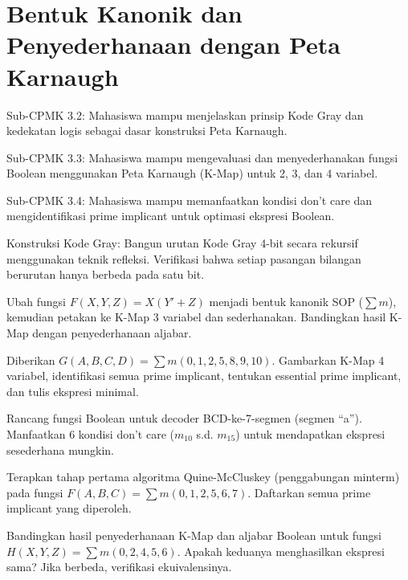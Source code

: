 \documentclass[../main]{subfiles}
\begin{document}
\chapter{Bentuk Kanonik dan Penyederhanaan dengan Peta Karnaugh}

\begin{subcpmk}
  \item Sub-CPMK 3.2: Mahasiswa mampu menjelaskan prinsip Kode Gray dan kedekatan logis sebagai dasar konstruksi Peta Karnaugh.
  \item Sub-CPMK 3.3: Mahasiswa mampu mengevaluasi dan menyederhanakan fungsi Boolean menggunakan Peta Karnaugh (K-Map) untuk 2, 3, dan 4 variabel.
  \item Sub-CPMK 3.4: Mahasiswa mampu memanfaatkan kondisi don't care dan mengidentifikasi prime implicant untuk optimasi ekspresi Boolean.
\end{subcpmk}










\begin{aktivitas}
  \item Konstruksi Kode Gray: Bangun urutan Kode Gray 4-bit secara rekursif menggunakan teknik refleksi. Verifikasi bahwa setiap pasangan bilangan berurutan hanya berbeda pada satu bit.
  \item Ubah fungsi $F(X,Y,Z) = X(Y' + Z)$ menjadi bentuk kanonik SOP ($\sum m$), kemudian petakan ke K-Map 3 variabel dan sederhanakan. Bandingkan hasil K-Map dengan penyederhanaan aljabar.
  \item Diberikan $G(A,B,C,D) = \sum m(0, 1, 2, 5, 8, 9, 10)$. Gambarkan K-Map 4 variabel, identifikasi semua prime implicant, tentukan essential prime implicant, dan tulis ekspresi minimal.
  \item Rancang fungsi Boolean untuk decoder BCD-ke-7-segmen (segmen ``a''). Manfaatkan 6 kondisi don't care ($m_{10}$ s.d. $m_{15}$) untuk mendapatkan ekspresi sesederhana mungkin.
  \item Terapkan tahap pertama algoritma Quine-McCluskey (penggabungan minterm) pada fungsi $F(A,B,C) = \sum m(0, 1, 2, 5, 6, 7)$. Daftarkan semua prime implicant yang diperoleh.
  \item Bandingkan hasil penyederhanaan K-Map dan aljabar Boolean untuk fungsi $H(X,Y,Z) = \sum m(0, 2, 4, 5, 6)$. Apakah keduanya menghasilkan ekspresi sama? Jika berbeda, verifikasi ekuivalensinya.
\end{aktivitas}
\end{document}
